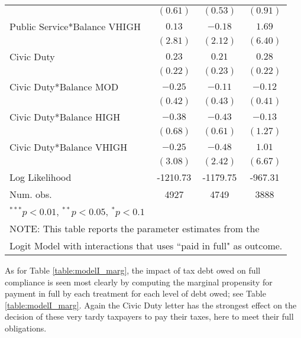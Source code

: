 \documentclass[12pt,titlepage]{article}
\begin{document}
\begin{table}[htbp]
\begin{center}
\begin{tabular}{|l|c|c|c|}
                             & $(0.61)$      & $(0.53)$      & $(0.91)$      \\
Public Service*Balance VHIGH & $0.13$        & $-0.18$       & $1.69$        \\
                             & $(2.81)$      & $(2.12)$      & $(6.40)$      \\
Civic Duty                   & $0.23$        & $0.21$        & $0.28$        \\
                             & $(0.22)$      & $(0.23)$      & $(0.22)$      \\
Civic Duty*Balance MOD       & $-0.25$       & $-0.11$       & $-0.12$       \\
                             & $(0.42)$      & $(0.43)$      & $(0.41)$      \\
Civic Duty*Balance HIGH      & $-0.38$       & $-0.43$       & $-0.13$       \\
                             & $(0.68)$      & $(0.61)$      & $(1.27)$      \\
Civic Duty*Balance VHIGH     & $-0.25$       & $-0.48$       & $1.01$        \\
                             & $(3.08)$      & $(2.42)$      & $(6.67)$      \\
\hline
Log Likelihood               & -1210.73      & -1179.75      & -967.31       \\
Num. obs.                    & 4927          & 4749          & 3888          \\
\hline
\multicolumn{4}{l}{\scriptsize{$^{***}p<0.01$, $^{**}p<0.05$, $^*p<0.1$}} \\
\multicolumn{4}{l}{NOTE: This table reports the parameter estimates from the} \\
\multicolumn{4}{l}{Logit Model with interactions that uses ``paid in full" as outcome.}
\end{tabular}
\label{table:pf_log_II}
\end{center}
\end{table}


As for Table \ref{table:modelI_marg}, the impact of tax debt owed on full compliance is
seen most clearly by computing the marginal propensity for payment in
full by each treatment for each level of debt owed; see Table \ref{table:modelI_marg}.
Again the Civic Duty letter has the strongest effect on the decision
of these very tardy taxpayers to pay their taxes, here to meet their
full obligations.
\end{document}
